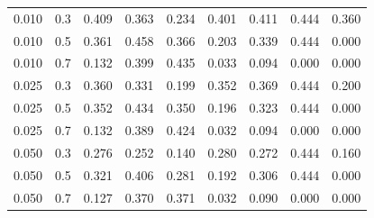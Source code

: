 \begin{tabular}{lllllllll}
0.010 & 0.3 & 0.409 & 0.363 & 0.234 & 0.401 & 0.411 & 0.444 & 0.360 \\
0.010 & 0.5 & 0.361 & 0.458 & 0.366 & 0.203 & 0.339 & 0.444 & 0.000 \\
0.010 & 0.7 & 0.132 & 0.399 & 0.435 & 0.033 & 0.094 & 0.000 & 0.000 \\
0.025 & 0.3 & 0.360 & 0.331 & 0.199 & 0.352 & 0.369 & 0.444 & 0.200 \\
0.025 & 0.5 & 0.352 & 0.434 & 0.350 & 0.196 & 0.323 & 0.444 & 0.000 \\
0.025 & 0.7 & 0.132 & 0.389 & 0.424 & 0.032 & 0.094 & 0.000 & 0.000 \\
0.050 & 0.3 & 0.276 & 0.252 & 0.140 & 0.280 & 0.272 & 0.444 & 0.160 \\
0.050 & 0.5 & 0.321 & 0.406 & 0.281 & 0.192 & 0.306 & 0.444 & 0.000 \\
0.050 & 0.7 & 0.127 & 0.370 & 0.371 & 0.032 & 0.090 & 0.000 & 0.000 \\
\end{tabular}
